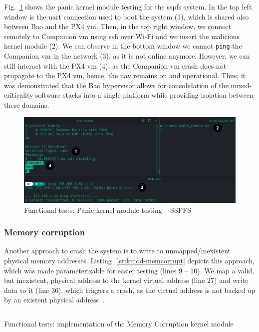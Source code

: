 Fig.~\ref{fig:kmod-panic-test-bao} shows the panic kernel module testing for the
\gls{sspfs} system. In the top
left window is the \gls{uart} connection used to boot the system (1), which is
shared also between Bao and the PX4 \gls{vm}. Then, in
the top right window, we connect remotely to Companion \gls{vm} using \gls{ssh} over Wi-Fi and we insert
the malicious kernel module (2). We can observe in the bottom window we cannot
\lstinline{ping} the Companion \gls{vm} in the network (3), as it is not online
anymore. However, we can still interact with the PX4 \gls{vm} (4), as the
Companion \gls{vm} crash does not propagate to the PX4 \gls{vm}, hence, the
\gls{uav} remains on and operational. Thus, it was
demonstrated that the Bao hypervisor allows for consolidation of the
mixed-criticality software stacks
into a single platform while providing isolation between these
domains.

\begin{figure}[!hbt]
  \centering
  \includegraphics[width=1.0\textwidth]{./img/png/kmod-panic-test-bao-annot} 
  \caption{Functional tests: Panic kernel module testing -- SSPFS}%
  \label{fig:kmod-panic-test-bao}
\end{figure}


\subsubsection{Memory corruption}
\label{sec:mem-corrupt}
Another approach to crash the system is to write to unmapped/inexistent physical
memory addresses. Listing~\ref{lst:kmod-memcorrupt} depicts this approach, which was
made parameterizable for easier testing (lines 9 -- 10). We map a valid, but inexistent, physical
address to the kernel virtual address (line 27) and write data to it (line 36),
which triggers a crash, as the virtual address is not backed up by an existent
physical address~\cite{iomapLinux}.

\begin{longlisting}
\centering
\inputminted[]{c}{./listing/kmod_memcorrupt.c}
\caption{Functional tests: implementation of the Memory Corruption kernel module}
\label{lst:kmod-memcorrupt}
\end{longlisting}

